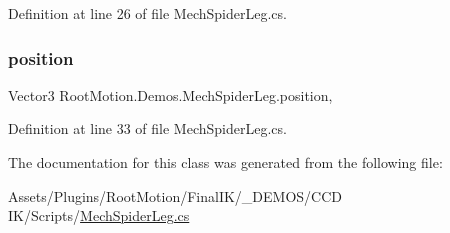 Definition at line 26 of file Mech\+Spider\+Leg.\+cs.

\mbox{\label{class_root_motion_1_1_demos_1_1_mech_spider_leg_aef09d6b598ecee61fb3cae6eccc884d9}} 
\subsubsection{\texorpdfstring{position}{position}}
{\footnotesize\ttfamily Vector3 Root\+Motion.\+Demos.\+Mech\+Spider\+Leg.\+position\hspace{0.3cm}{\ttfamily [get]}, {\ttfamily [set]}}



Definition at line 33 of file Mech\+Spider\+Leg.\+cs.



The documentation for this class was generated from the following file\+:\begin{DoxyCompactItemize}
\item 
Assets/\+Plugins/\+Root\+Motion/\+Final\+I\+K/\+\_\+\+D\+E\+M\+O\+S/\+C\+C\+D I\+K/\+Scripts/\mbox{\hyperlink{_mech_spider_leg_8cs}{Mech\+Spider\+Leg.\+cs}}\end{DoxyCompactItemize}
